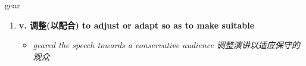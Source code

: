 
\begin{frame}
{\huge gear}
\begin{center}
\begin{enumerate}\Large
  \item \textbf{v. 调整(以配合) to adjust or adapt so as to make suitable}
  \begin{itemize}
    \item \em{\Large{geared the speech towards a conservative audience 调整演讲以适应保守的观众}}
  \end{itemize}
\end{enumerate}
\end{center}
\end{frame}
